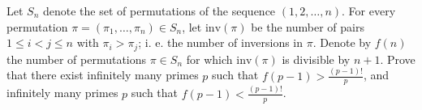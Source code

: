 Let \(S_n\) denote the set of permutations of the sequence \((1,2,\dots, n)\). For every permutation \(\pi=(\pi_1, \dots, \pi_n)\in S_n\), let \(\mathrm{inv}(\pi)\) be the number of pairs \(1\le i < j \le n\) with \(\pi_i>\pi_j\); i. e. the number of inversions in \(\pi\). Denote by \(f(n)\) the number of permutations \(\pi\in S_n\) for which \(\mathrm{inv}(\pi)\) is divisible by \(n+1\).
Prove that there exist infinitely many primes \(p\) such that \(f(p-1)>\frac{(p-1)!}{p}\), and infinitely many primes \(p\) such that \(f(p-1)<\frac{(p-1)!}{p}\).